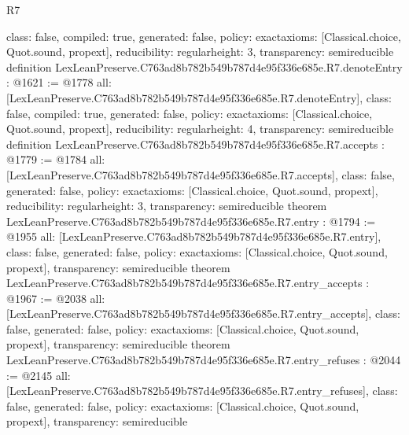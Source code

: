 \begin{lexlean}{R7}
\begin{coremodule}
{  class: false,
  compiled: true,
  generated: false,
  policy: exact{axioms: [Classical.choice, Quot.sound, propext]},
  reducibility: regular{height: 3},
  transparency: semireducible
}
definition LexLeanPreserve.C763ad8b782b549b787d4e95f336e685e.R7.denoteEntry : @1621 := @1778 {
  all: [LexLeanPreserve.C763ad8b782b549b787d4e95f336e685e.R7.denoteEntry],
  class: false,
  compiled: true,
  generated: false,
  policy: exact{axioms: [Classical.choice, Quot.sound, propext]},
  reducibility: regular{height: 4},
  transparency: semireducible
}
definition LexLeanPreserve.C763ad8b782b549b787d4e95f336e685e.R7.accepts : @1779 := @1784 {
  all: [LexLeanPreserve.C763ad8b782b549b787d4e95f336e685e.R7.accepts],
  class: false,
  generated: false,
  policy: exact{axioms: [Classical.choice, Quot.sound, propext]},
  reducibility: regular{height: 3},
  transparency: semireducible
}
theorem LexLeanPreserve.C763ad8b782b549b787d4e95f336e685e.R7.entry : @1794 := @1955 {
  all: [LexLeanPreserve.C763ad8b782b549b787d4e95f336e685e.R7.entry],
  class: false,
  generated: false,
  policy: exact{axioms: [Classical.choice, Quot.sound, propext]},
  transparency: semireducible
}
theorem LexLeanPreserve.C763ad8b782b549b787d4e95f336e685e.R7.entry_accepts : @1967 := @2038 {
  all: [LexLeanPreserve.C763ad8b782b549b787d4e95f336e685e.R7.entry_accepts],
  class: false,
  generated: false,
  policy: exact{axioms: [Classical.choice, Quot.sound, propext]},
  transparency: semireducible
}
theorem LexLeanPreserve.C763ad8b782b549b787d4e95f336e685e.R7.entry_refuses : @2044 := @2145 {
  all: [LexLeanPreserve.C763ad8b782b549b787d4e95f336e685e.R7.entry_refuses],
  class: false,
  generated: false,
  policy: exact{axioms: [Classical.choice, Quot.sound, propext]},
  transparency: semireducible
}


\end{coremodule}
\end{lexlean}

